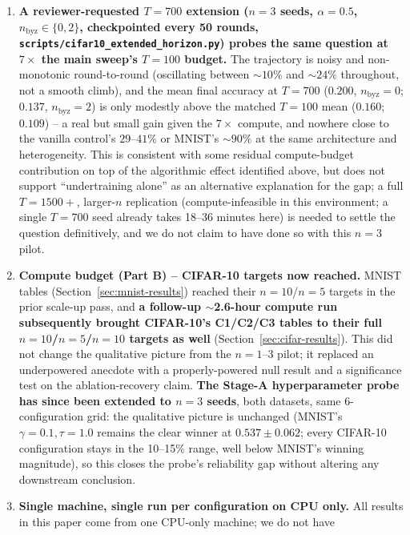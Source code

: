 \documentclass{article}
\begin{document}
\begin{enumerate}
  architecture and tuning) that would fully separate the two explanations,
  and we do not claim to have done so here.
\item \textbf{A reviewer-requested $T{=}700$ extension ($n{=}3$ seeds,
  $\alpha{=}0.5$, $n_{\text{byz}}\in\{0,2\}$, checkpointed every 50 rounds,
  \texttt{scripts/cifar10\_extended\_horizon.py}) probes the same question at
  $7\times$ the main sweep's $T{=}100$ budget.} The trajectory is noisy and
  non-monotonic round-to-round (oscillating between $\sim$$10\%$ and
  $\sim$$24\%$ throughout, not a smooth climb), and the mean final accuracy
  at $T{=}700$ ($0.200$, $n_{\text{byz}}{=}0$; $0.137$, $n_{\text{byz}}{=}2$)
  is only modestly above the matched $T{=}100$ mean ($0.160$; $0.109$) --
  a real but small gain given the $7\times$ compute, and nowhere close to the
  vanilla control's $29$--$41\%$ or MNIST's $\sim$$90\%$ at the same
  architecture and heterogeneity. This is consistent with some residual
  compute-budget contribution on top of the algorithmic effect identified
  above, but does not support ``undertraining alone'' as an alternative
  explanation for the gap; a full $T{=}1500{+}$, larger-$n$ replication
  (compute-infeasible in this environment; a single $T{=}700$ seed already
  takes 18--36 minutes here) is needed to settle the question definitively,
  and we do not claim to have done so with this $n{=}3$ pilot.
\item \textbf{Compute budget (Part B) -- CIFAR-10 targets now reached.} MNIST
  tables (Section~\ref{sec:mnist-results}) reached their $n{=}10$/$n{=}5$
  targets in the prior scale-up pass, and \textbf{a follow-up $\sim$2.6-hour
  compute run subsequently brought CIFAR-10's C1/C2/C3 tables to their full
  $n{=}10$/$n{=}5$/$n{=}10$ targets as well} (Section~\ref{sec:cifar-results}).
  This did not change the qualitative picture from the $n{=}1$--$3$ pilot; it
  replaced an underpowered anecdote with a properly-powered null result and a
  significance test on the ablation-recovery claim. \textbf{The Stage-A
  hyperparameter probe has since been extended to $n{=}3$ seeds}, both
  datasets, same 6-configuration grid: the qualitative picture is unchanged
  (MNIST's $\gamma{=}0.1,\tau{=}1.0$ remains the clear winner at
  $0.537\pm0.062$; every CIFAR-10 configuration stays in the 10--15\% range,
  well below MNIST's winning magnitude), so this closes the probe's
  reliability gap without altering any downstream conclusion.
\item \textbf{Single machine, single run per configuration on CPU only.} All
  results in this paper come from one CPU-only machine; we do not have
$$
\end{enumerate}
\end{document}
